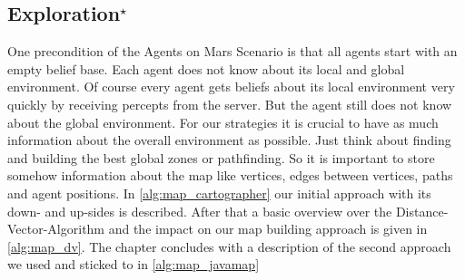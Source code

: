 \subsection[Exploration]{Exploration$^\star$}\label{alg:exploration}
One precondition of the Agents on Mars Scenario is that all agents start with an empty belief base. Each agent does not know about its local and global environment. Of course every agent gets beliefs about its local environment very quickly by receiving percepts from the server. But the agent still does not know about the global environment. For our strategies it is crucial to have as much information about the overall environment as possible. Just think about finding and building the best global zones or pathfinding. So it is important to store somehow information about the map like vertices, edges between vertices, paths and agent positions. In \autoref{alg:map_cartographer} our initial approach with its down- and up-sides is described. After that a basic overview over the Distance-Vector-Algorithm and the impact on our map building approach is given in \autoref{alg:map_dv}. The chapter concludes with a description of the second approach we used and sticked to in \autoref{alg:map_javamap}


